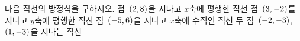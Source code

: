 다음 직선의 방정식을 구하시오.
 점~$(2{,}\mkern3mu\mathopen{}8)$을 지나고 $x$축에 평행한 직선
 점~$(3{,}\mkern3mu\mathopen{}-2)$를 지나고 $y$축에 평행한 직선
 점~$(-5{,}\mkern3mu\mathopen{}6)$을 지나고 $x$축에 수직인 직선
 두 점~$(-2{,}\mkern3mu\mathopen{}-3)$, $(1{,}\mkern3mu\mathopen{}-3)$을 지나는 직선

